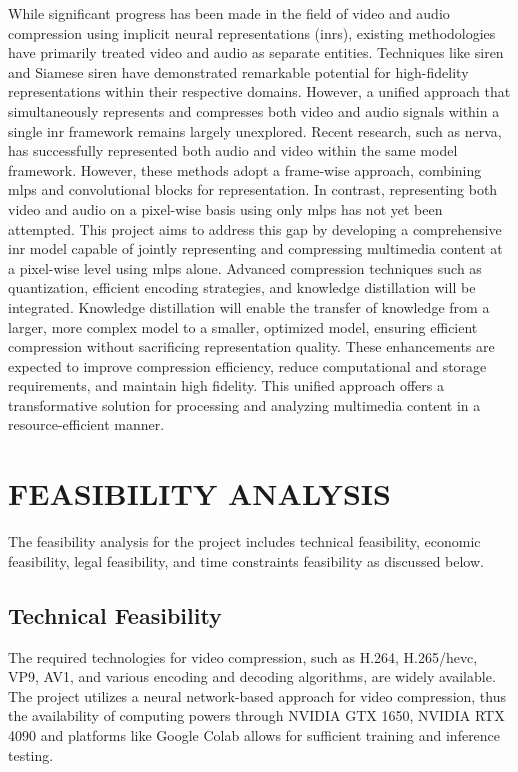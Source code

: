 \documentclass{ioereport}
\begin{document}
While significant progress has been made in the field of video and audio compression using implicit neural representations (\gls{inr}s), existing methodologies have primarily treated video and audio as separate entities. Techniques like \gls{siren} and Siamese \gls{siren} have demonstrated remarkable potential for high-fidelity representations within their respective domains. However, a unified approach that simultaneously represents and compresses both video and audio signals within a single \gls{inr} framework remains largely unexplored. Recent research, such as \gls{nerva}, has successfully represented both audio and video within the same model framework. However, these methods adopt a frame-wise approach, combining \gls{mlp}s and convolutional blocks for representation. In contrast, representing both video and audio on a pixel-wise basis using only \gls{mlp}s has not yet been attempted. This project aims to address this gap by developing a comprehensive \gls{inr} model capable of jointly representing and compressing multimedia content at a pixel-wise level using \gls{mlp}s alone. Advanced compression techniques such as quantization, efficient encoding strategies, and knowledge distillation will be integrated. Knowledge distillation will enable the transfer of knowledge from a larger, more complex model to a smaller, optimized model, ensuring efficient compression without sacrificing representation quality. These enhancements are expected to improve compression efficiency, reduce computational and storage requirements, and maintain high fidelity. This unified approach offers a transformative solution for processing and analyzing multimedia content in a resource-efficient manner.
\pagebreak


\section{\MakeUppercase{Feasibility Analysis}}
The feasibility analysis for the project includes technical feasibility, economic feasibility, legal feasibility, and time constraints feasibility as discussed below.
    \subsection{Technical Feasibility}
    The required technologies for video compression, such as H.264, H.265/\gls{hevc}, VP9, AV1, and various encoding and decoding algorithms, are widely available. The project utilizes a neural network-based approach for video compression, thus the availability of computing powers through NVIDIA GTX 1650, NVIDIA RTX 4090 and platforms like Google Colab allows for sufficient training and inference testing.
\end{document}
